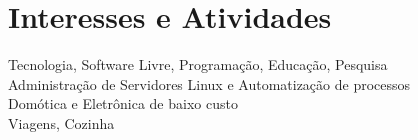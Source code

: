 \documentclass[a4paper,10pt]{article}
\begin{document}
\section{Interesses e Atividades}
Tecnologia, Software Livre, Programação, Educação, Pesquisa \\
Administração de Servidores Linux e Automatização de processos \\
Domótica e Eletrônica de baixo custo \\
Viagens, Cozinha

\vfill
\hrulefill\\
\center{\footnotesize{\today}}
\end{document}
